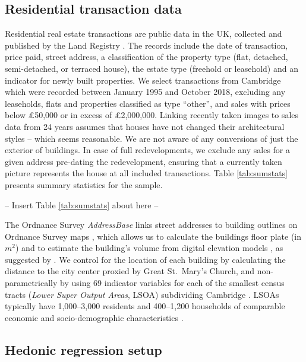 \documentclass[]{article}
\begin{document}
\hypertarget{residential-transaction-data}{%
\subsection{Residential transaction
data}\label{residential-transaction-data}}

Residential real estate transactions are public data in the UK,
collected and published by the Land Registry
\autocite{LandRegistry2016a}. The records include the date of
transaction, price paid, street address, a classification of the
property type (flat, detached, semi-detached, or terraced house), the
estate type (freehold or leasehold) and an indicator for newly built
properties. We select transactions from Cambridge which were recorded
between January 1995 and October 2018, excluding any leaseholds, flats
and properties classified as type ``other'', and sales with prices below
£50,000 or in excess of £2,000,000. Linking recently taken images to
sales data from 24 years assumes that houses have not changed their
architectural styles -- which seems reasonable. We are not aware of any
conversions of just the exterior of buildings. In case of full
redevelopments, we exclude any sales for a given address pre-dating the
redevelopment, ensuring that a currently taken picture represents the
house at all included transactions. Table \ref{tab:sumstats} presents
summary statistics for the sample.

\begin{center}
  -- Insert Table \ref{tab:sumstats} about here --
\end{center}

The Ordnance Survey \emph{AddressBase} \autocite{OrdnanceSurvey2017}
links street addresses to building outlines on Ordnance Survey maps
\autocite{OrdnanceSurvey2017a}, which allows us to calculate the
buildings floor plate (in \(m^2\)) and to estimate the building's volume
from digital elevation models \autocite{EnvironmentAgency2015}, as
suggested by \textcite{Lindenthal2017}. We control for the location of
each building by calculating the distance to the city center proxied by
Great St.~Mary's Church, and non-parametrically by using 69 indicator
variables for each of the smallest census tracts (\emph{Lower Super
Output Areas}, LSOA) subdividing Cambridge \autocite{ONS2017}. LSOAs
typically have 1,000--3,000 residents and 400--1,200 households of
comparable economic and socio-demographic characteristics
\autocite{ONS2017b}.

\hypertarget{hedonic-regression-setup}{%
\subsection{Hedonic regression setup}\label{hedonic-regression-setup}}
\end{document}
